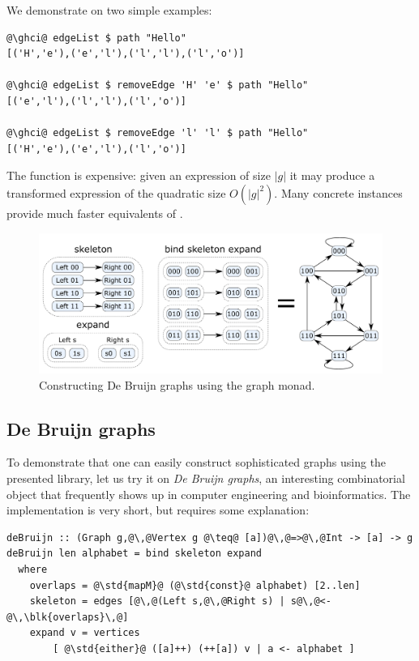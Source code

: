 We demonstrate  on two simple examples:
\begin{verbatim}
@\ghci@ edgeList $ path "Hello"
[('H','e'),('e','l'),('l','l'),('l','o')]

@\ghci@ edgeList $ removeEdge 'H' 'e' $ path "Hello"
[('e','l'),('l','l'),('l','o')]

@\ghci@ edgeList $ removeEdge 'l' 'l' $ path "Hello"
[('H','e'),('e','l'),('l','o')]
\end{verbatim}

\noindent
The  function is expensive: given an expression of size $|g|$
it may produce a transformed expression of the quadratic size $O(|g|^2)$. Many
concrete  instances provide much faster equivalents of .

\begin{figure}
\centerline{\includegraphics[scale=0.3]{fig/De-Bruijn-construction.pdf}}
\caption{Constructing De Bruijn graphs using the graph monad.\label{fig-de-bruijn}}
\end{figure}

\subsection{De Bruijn graphs}

To demonstrate that one can easily construct sophisticated graphs using
the presented library, let us try it on \emph{De Bruijn graphs}, an interesting
combinatorial object that frequently shows up in computer engineering and
bioinformatics. The implementation is very short, but requires some explanation:

\begin{verbatim}
deBruijn :: (Graph g,@\,@Vertex g @\teq@ [a])@\,@=>@\,@Int -> [a] -> g
deBruijn len alphabet = bind skeleton expand
  where
    overlaps = @\std{mapM}@ (@\std{const}@ alphabet) [2..len]
    skeleton = edges [@\,@(Left s,@\,@Right s) | s@\,@<-@\,\blk{overlaps}\,@]
    expand v = vertices
        [ @\std{either}@ ([a]++) (++[a]) v | a <- alphabet ]
\end{verbatim}

